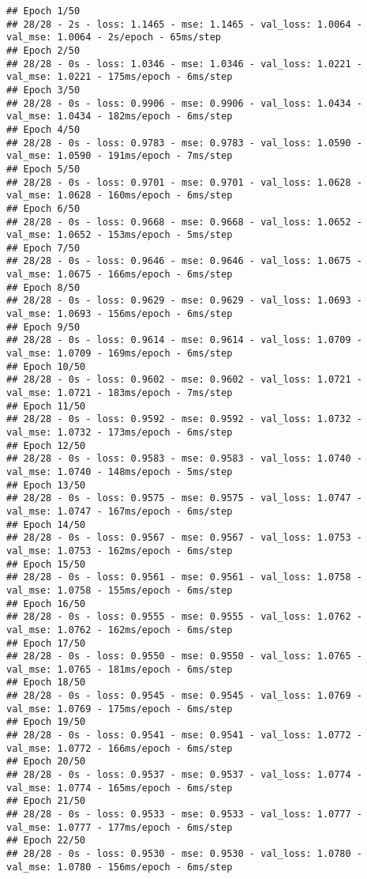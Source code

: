 \documentclass[
]{article}
\begin{document}
\begin{verbatim}
## Epoch 1/50
## 28/28 - 2s - loss: 1.1465 - mse: 1.1465 - val_loss: 1.0064 - val_mse: 1.0064 - 2s/epoch - 65ms/step
## Epoch 2/50
## 28/28 - 0s - loss: 1.0346 - mse: 1.0346 - val_loss: 1.0221 - val_mse: 1.0221 - 175ms/epoch - 6ms/step
## Epoch 3/50
## 28/28 - 0s - loss: 0.9906 - mse: 0.9906 - val_loss: 1.0434 - val_mse: 1.0434 - 182ms/epoch - 6ms/step
## Epoch 4/50
## 28/28 - 0s - loss: 0.9783 - mse: 0.9783 - val_loss: 1.0590 - val_mse: 1.0590 - 191ms/epoch - 7ms/step
## Epoch 5/50
## 28/28 - 0s - loss: 0.9701 - mse: 0.9701 - val_loss: 1.0628 - val_mse: 1.0628 - 160ms/epoch - 6ms/step
## Epoch 6/50
## 28/28 - 0s - loss: 0.9668 - mse: 0.9668 - val_loss: 1.0652 - val_mse: 1.0652 - 153ms/epoch - 5ms/step
## Epoch 7/50
## 28/28 - 0s - loss: 0.9646 - mse: 0.9646 - val_loss: 1.0675 - val_mse: 1.0675 - 166ms/epoch - 6ms/step
## Epoch 8/50
## 28/28 - 0s - loss: 0.9629 - mse: 0.9629 - val_loss: 1.0693 - val_mse: 1.0693 - 156ms/epoch - 6ms/step
## Epoch 9/50
## 28/28 - 0s - loss: 0.9614 - mse: 0.9614 - val_loss: 1.0709 - val_mse: 1.0709 - 169ms/epoch - 6ms/step
## Epoch 10/50
## 28/28 - 0s - loss: 0.9602 - mse: 0.9602 - val_loss: 1.0721 - val_mse: 1.0721 - 183ms/epoch - 7ms/step
## Epoch 11/50
## 28/28 - 0s - loss: 0.9592 - mse: 0.9592 - val_loss: 1.0732 - val_mse: 1.0732 - 173ms/epoch - 6ms/step
## Epoch 12/50
## 28/28 - 0s - loss: 0.9583 - mse: 0.9583 - val_loss: 1.0740 - val_mse: 1.0740 - 148ms/epoch - 5ms/step
## Epoch 13/50
## 28/28 - 0s - loss: 0.9575 - mse: 0.9575 - val_loss: 1.0747 - val_mse: 1.0747 - 167ms/epoch - 6ms/step
## Epoch 14/50
## 28/28 - 0s - loss: 0.9567 - mse: 0.9567 - val_loss: 1.0753 - val_mse: 1.0753 - 162ms/epoch - 6ms/step
## Epoch 15/50
## 28/28 - 0s - loss: 0.9561 - mse: 0.9561 - val_loss: 1.0758 - val_mse: 1.0758 - 155ms/epoch - 6ms/step
## Epoch 16/50
## 28/28 - 0s - loss: 0.9555 - mse: 0.9555 - val_loss: 1.0762 - val_mse: 1.0762 - 162ms/epoch - 6ms/step
## Epoch 17/50
## 28/28 - 0s - loss: 0.9550 - mse: 0.9550 - val_loss: 1.0765 - val_mse: 1.0765 - 181ms/epoch - 6ms/step
## Epoch 18/50
## 28/28 - 0s - loss: 0.9545 - mse: 0.9545 - val_loss: 1.0769 - val_mse: 1.0769 - 175ms/epoch - 6ms/step
## Epoch 19/50
## 28/28 - 0s - loss: 0.9541 - mse: 0.9541 - val_loss: 1.0772 - val_mse: 1.0772 - 166ms/epoch - 6ms/step
## Epoch 20/50
## 28/28 - 0s - loss: 0.9537 - mse: 0.9537 - val_loss: 1.0774 - val_mse: 1.0774 - 165ms/epoch - 6ms/step
## Epoch 21/50
## 28/28 - 0s - loss: 0.9533 - mse: 0.9533 - val_loss: 1.0777 - val_mse: 1.0777 - 177ms/epoch - 6ms/step
## Epoch 22/50
## 28/28 - 0s - loss: 0.9530 - mse: 0.9530 - val_loss: 1.0780 - val_mse: 1.0780 - 156ms/epoch - 6ms/step

\end{verbatim}
\end{document}
